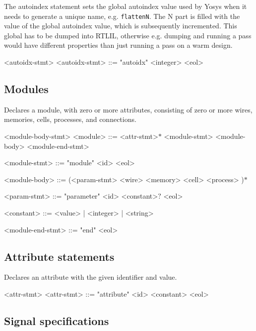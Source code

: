 The autoindex statement sets the global autoindex value used by Yosys when it needs to generate a unique name, e.g. \texttt{\textdollar{}flatten\textdollar{}N}. The N part is filled with the value of the global autoindex value, which is subsequently incremented. This global has to be dumped into RTLIL, otherwise e.g. dumping and running a pass would have different properties than just running a pass on a warm design.

\begin{indentgrammar}{<autoidx-stmt>}
<autoidx-stmt> ::= "autoidx" <integer> <eol>
\end{indentgrammar}

\subsection{Modules}

Declares a module, with zero or more attributes, consisting of zero or more wires, memories, cells, processes, and connections.

\begin{indentgrammar}{<module-body-stmt>}
<module> ::= <attr-stmt>$*$ <module-stmt> <module-body> <module-end-stmt>

<module-stmt> ::= "module" <id> <eol>

<module-body> ::= 
(<param-stmt>
  \alt <wire>
  \alt <memory>
  \alt <cell>
  \alt <process>
  )$*$

<param-stmt> ::= "parameter" <id> <constant>$?$ <eol>

<constant> ::= <value> | <integer> | <string>

<module-end-stmt> ::= "end" <eol>
\end{indentgrammar}

\subsection{Attribute statements}

Declares an attribute with the given identifier and value.

\begin{indentgrammar}{<attr-stmt>}
<attr-stmt> ::= "attribute" <id> <constant> <eol>
\end{indentgrammar}

\subsection{Signal specifications}

